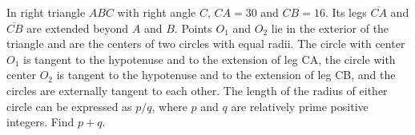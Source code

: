 In right triangle $ABC$ with right angle $C$, $CA=30$ and $CB=16$.  Its legs $\overline{CA}$ and $\overline{CB}$ are extended beyond $A$ and $B$.  Points $O_{1}$ and $O_{2}$ lie in the exterior of the triangle and are the centers of two circles with equal radii.  The circle with center $O_{1}$ is tangent to the hypotenuse and to the extension of leg CA, the circle with center $O_{2}$ is tangent to the hypotenuse and to the extension of leg CB, and the circles are externally tangent to each other.  The length of the radius of either circle can be expressed as $p/q$, where $p$ and $q$ are relatively prime positive integers.  Find $p+q$.